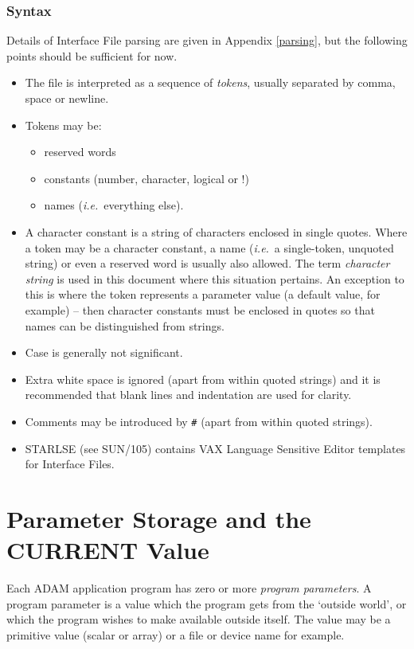 \documentclass[twoside,11pt]{article}
\newcommand{\xlabel}[1]{}
\renewcommand{\_}{\texttt{\symbol{95}}}
\begin{document}
\subsubsection{Syntax}
Details of Interface File parsing are given in Appendix \ref{parsing}, but the
following points should be sufficient for now.
\begin{itemize}
\item The file is interpreted as a sequence of {\em tokens}, usually separated
by comma, space or newline.
\item Tokens may be:
\begin{itemize}
\item reserved words
\item constants (number, character, logical or !)
\item names ({\em i.e.}\ everything else).
\end {itemize}
\item A character constant is a string of characters enclosed in single quotes.
Where a token may be a character constant, a name ({\em i.e.}\ a
single-token, unquoted string) or even a reserved word is usually also allowed.
The term {\em character string} is used in this document where this situation
pertains.
An exception to this is where the token represents a parameter value (a
default value, for example) -- then character constants must be enclosed in
quotes so that names can be distinguished from strings.
\item Case is generally not significant.
\item Extra white space is ignored (apart from within quoted
strings) and it is recommended that blank lines and indentation are used for
clarity.
\item Comments may be introduced by \texttt{\#} (apart from within
quoted strings).
\item STARLSE (see SUN/105) contains VAX Language Sensitive Editor templates
for Interface Files.
\end{itemize}

\section{Parameter Storage and the CURRENT Value\xlabel{parameter_storage}
\label{current}}

Each ADAM application program has zero or more {\em program parameters}.
A program parameter is a value which the program gets
from the `outside world', or which the program wishes to make available
outside itself. The value may be a primitive value (scalar or array) or a file
or device name for example.
\end{document}
